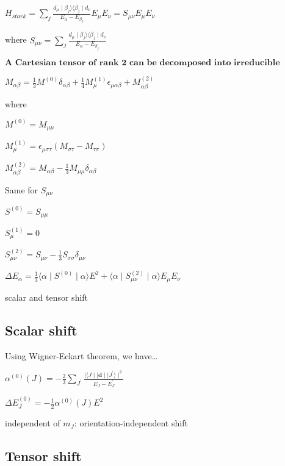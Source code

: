 \documentclass{article}
\begin{document}
$H_{stark} = \sum_j \frac{d_{\mu} \mid \beta_j \rangle \langle \beta_j \mid d_{\nu}}{E_{\alpha} - E_{\beta_j}}E_{\mu} E_{\nu} = S_{\mu \nu} E_{\mu} E_{\nu}$

where
$S_{\mu \nu} = \sum_j \frac{d_{\mu} \mid \beta_j \rangle \langle \beta_j \mid d_{\nu}}{E_{\alpha} - E_{\beta_j}}$

    $\textbf{A Cartesian tensor of rank 2 can be decomposed into irreducible spherical tensors of rank 0, 1, 2 as}$

$M_{\alpha \beta} = \frac{1}{3} M^{(0)} \delta_{\alpha \beta} + \frac{1}{4} M_{\mu}^{(1)} \epsilon_{\mu \alpha \beta} + M_{\alpha \beta}^{(2)}$

where

$M^{(0)} = M_{\mu \mu}$

$M_{\mu}^{(1)} = \epsilon_{\mu \sigma \tau} (M_{\sigma \tau} - M_{\tau \sigma})$

$M_{\alpha \beta}^{(2)} = M_{\alpha \beta} - \frac{1}{3} M_{\mu \mu} \delta_{\alpha \beta}$

    Same for $S_{\mu \nu}$

$S^{(0)} = S_{\mu \mu}$

$S_{\mu}^{(1)} = 0$

$S_{\mu \nu}^{(2)} = S_{\mu \nu} - \frac{1}{3} S_{\sigma \sigma} \delta_{\mu \nu}$

$\Delta E_{\alpha} = \frac{1}{3} \langle \alpha \mid S^{(0)} \mid \alpha \rangle E^2 + \langle \alpha \mid S^{(2)}_{\mu \nu} \mid \alpha \rangle E_{\mu} E_{\nu}$

scalar and tensor shift

    \subsection{Scalar shift}\label{scalar-shift}

    Using Wigner-Eckart theorem, we have\ldots{}

$\alpha^{(0)}(J) = -\frac{2}{3} \sum_{J^{'}} \frac{\mid \langle J \mid\mid \textbf{d} \mid\mid J^{'}\rangle \mid^2}{E_J - E_{J}^{'}}$

$\Delta E_J ^{(0)} = -\frac{1}{2} \alpha^{(0)} (J) E^2$

independent of $m_J$: orientation-independent shift

    \subsection{Tensor shift}\label{tensor-shift}
\end{document}

